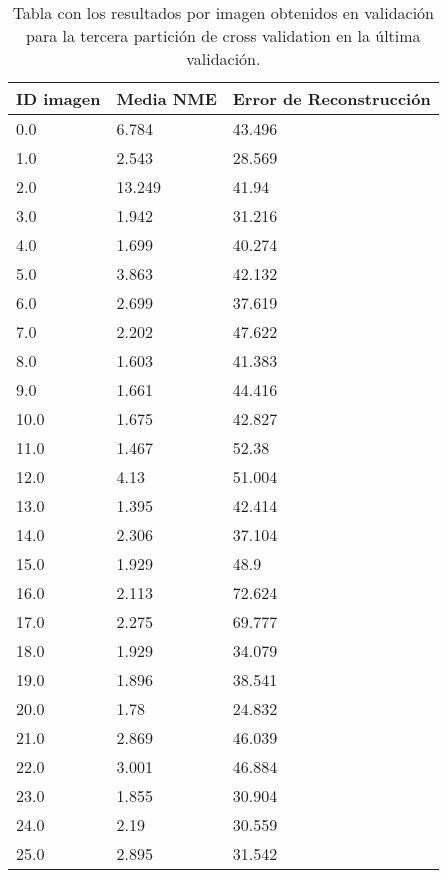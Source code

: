 \begin{table}[!ht]
    \centering
    \caption{Tabla con los resultados por imagen obtenidos en validación para la tercera partición de cross validation en la última validación.}
    \begin{tabular}{|l|l|l|}
    \hline
        ID imagen & Media NME & Error de Reconstrucción \\ \hline
        0.0 & 6.784 & 43.496 \\ \hline
        1.0 & 2.543 & 28.569 \\ \hline
        2.0 & 13.249 & 41.94 \\ \hline
        3.0 & 1.942 & 31.216 \\ \hline
        4.0 & 1.699 & 40.274 \\ \hline
        5.0 & 3.863 & 42.132 \\ \hline
        6.0 & 2.699 & 37.619 \\ \hline
        7.0 & 2.202 & 47.622 \\ \hline
        8.0 & 1.603 & 41.383 \\ \hline
        9.0 & 1.661 & 44.416 \\ \hline
        10.0 & 1.675 & 42.827 \\ \hline
        11.0 & 1.467 & 52.38 \\ \hline
        12.0 & 4.13 & 51.004 \\ \hline
        13.0 & 1.395 & 42.414 \\ \hline
        14.0 & 2.306 & 37.104 \\ \hline
        15.0 & 1.929 & 48.9 \\ \hline
        16.0 & 2.113 & 72.624 \\ \hline
        17.0 & 2.275 & 69.777 \\ \hline
        18.0 & 1.929 & 34.079 \\ \hline
        19.0 & 1.896 & 38.541 \\ \hline
        20.0 & 1.78 & 24.832 \\ \hline
        21.0 & 2.869 & 46.039 \\ \hline
        22.0 & 3.001 & 46.884 \\ \hline
        23.0 & 1.855 & 30.904 \\ \hline
        24.0 & 2.19 & 30.559 \\ \hline
        25.0 & 2.895 & 31.542 \\ \hline
    \end{tabular}
    \label{table:Decoder_images_3}
\end{table}

